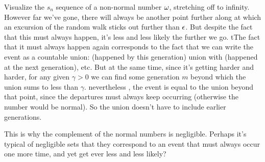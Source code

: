 \begin{intuition}
  Visualize the $s_n$ sequence of a non-normal number $\omega$, stretching off to infinity. However far we’ve
  gone, there will always be another point further along at which an excursion of the random walk sticks out
  further than $\epsilon$. But despite the fact that this must always happen, it’s less and less likely the further
  we go. tThe fact that it must always happen again corresponds to the fact that we can write the event as a
  countable union: (happened by this generation) union with (happened at the next generation), etc. But at the
  same time, since it’s getting harder and harder, for any given $\gamma >0$ we can find some generation $m$
  beyond which the union sums to less than $\gamma$. nevertheless , the event is equal to the union beyond that
  point, since the departures must always keep occurring (otherwise the number would be normal). So the union
  doesn’t have to include earlier generations.

  This is why the complement of the normal numbers is negligible. Perhaps it’s typical of negligible sets that
  they correspond to an event that must always occur one more time, and yet get ever less and less likely?
\end{intuition}

